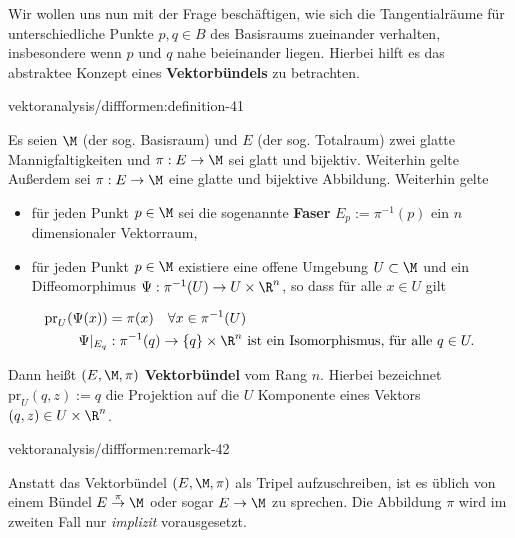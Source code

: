 \documentclass[letterpaper,10pt,english]{jupyterBook}
\begin{document}
\par
Wir wollen uns nun mit der Frage beschäftigen, wie sich die Tangentialräume für unterschiedliche Punkte \(p,q\in B\) des Basisraums zueinander verhalten, insbesondere wenn \(p\) und \(q\) nahe beieinander liegen.
Hierbei hilft es das abstraktee Konzept eines \textbf{Vektorbündels} zu betrachten.
\begin{definition}{}{vektoranalysis/diffformen:definition-41}



\par
Es seien \(\M\) (der sog. Basisraum) und \(E\) (der sog. Totalraum) zwei glatte Mannigfaltigkeiten und \(\pi:E\to \M\) sei glatt und bijektiv. Weiterhin gelte
Außerdem sei \(\pi:E\to \M\) eine glatte und bijektive Abbildung.
Weiterhin gelte
\begin{itemize}
\item {} 
\par
für jeden Punkt \(p\in \M\) sei die sogenannte \textbf{Faser} \(E_p:= \pi^{-1}(p)\) ein \(n\) dimensionaler Vektorraum,

\item {} 
\par
für jeden Punkt \(p\in \M\) existiere eine offene Umgebung \(U\subset \M\) und ein Diffeomorphimus \(\Psi: \pi^{-1}(U)\to U\times\R^n\), so dass für alle \(x\in U\) gilt

\end{itemize}
\begin{align*}
\text{pr}_U(\Psi(x)) &= \pi(x)\quad\forall x\in \pi^{-1}(U)\\
\Psi\rvert_{E_q}&: \pi^{-1}(q) \to \{q\}\times \R^n \text{ ist ein Isomorphismus, für alle }q\in U.
\end{align*}
\par
Dann heißt \((E,\M,\pi)\) \textbf{Vektorbündel} vom Rang \(n\).
Hierbei bezeichnet \(\text{pr}_U(q, z):= q\) die Projektion auf die \(U\) Komponente eines Vektors \((q,z)\in U\times\R^n\).
\end{definition}
\begin{remark}{}{vektoranalysis/diffformen:remark-42}



\par
Anstatt das Vektorbündel \((E,\M,\pi)\) als Tripel aufzuschreiben, ist es üblich von einem Bündel \(E\overset{\pi}{\to}\M\) oder sogar \(E\to\M\) zu sprechen.
Die Abbildung \(\pi\) wird im zweiten Fall nur \emph{implizit} vorausgesetzt.
\end{remark}
\end{document}
